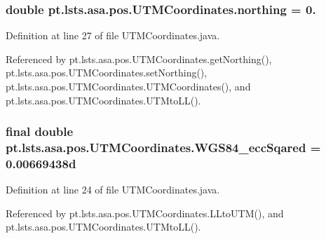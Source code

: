 \hypertarget{classpt_1_1lsts_1_1asa_1_1pos_1_1UTMCoordinates_a67e32d6d5f1e61c42c06ebb06e3223ac}{}
\subsubsection[{northing}]{\setlength{\rightskip}{0pt plus 5cm}double pt.\+lsts.\+asa.\+pos.\+U\+T\+M\+Coordinates.\+northing = 0.\hspace{0.3cm}{\ttfamily [private]}}\label{classpt_1_1lsts_1_1asa_1_1pos_1_1UTMCoordinates_a67e32d6d5f1e61c42c06ebb06e3223ac}


Definition at line 27 of file U\+T\+M\+Coordinates.\+java.



Referenced by pt.\+lsts.\+asa.\+pos.\+U\+T\+M\+Coordinates.\+get\+Northing(), pt.\+lsts.\+asa.\+pos.\+U\+T\+M\+Coordinates.\+set\+Northing(), pt.\+lsts.\+asa.\+pos.\+U\+T\+M\+Coordinates.\+U\+T\+M\+Coordinates(), and pt.\+lsts.\+asa.\+pos.\+U\+T\+M\+Coordinates.\+U\+T\+Mto\+L\+L().

\hypertarget{classpt_1_1lsts_1_1asa_1_1pos_1_1UTMCoordinates_a9e95f9f1c3337f24dd6b4a1b08479559}{}
\subsubsection[{W\+G\+S84\+\_\+ecc\+Sqared}]{\setlength{\rightskip}{0pt plus 5cm}final double pt.\+lsts.\+asa.\+pos.\+U\+T\+M\+Coordinates.\+W\+G\+S84\+\_\+ecc\+Sqared = 0.\+00669438d\hspace{0.3cm}{\ttfamily [private]}}\label{classpt_1_1lsts_1_1asa_1_1pos_1_1UTMCoordinates_a9e95f9f1c3337f24dd6b4a1b08479559}


Definition at line 24 of file U\+T\+M\+Coordinates.\+java.



Referenced by pt.\+lsts.\+asa.\+pos.\+U\+T\+M\+Coordinates.\+L\+Lto\+U\+T\+M(), and pt.\+lsts.\+asa.\+pos.\+U\+T\+M\+Coordinates.\+U\+T\+Mto\+L\+L().

